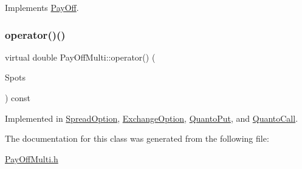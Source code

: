 Implements \hyperlink{classPayOff_a5ae17d82c233ef5568c8fb0539703000}{Pay\+Off}.

\hypertarget{classPayOffMulti_a61039e0c0ee136842b5d6f340b9f8155}{}\label{classPayOffMulti_a61039e0c0ee136842b5d6f340b9f8155} 
\subsubsection{\texorpdfstring{operator()()}{operator()()}\hspace{0.1cm}{\footnotesize\ttfamily [2/2]}}
{\footnotesize\ttfamily virtual double Pay\+Off\+Multi\+::operator() (\begin{DoxyParamCaption}\item[{const \hyperlink{classMJArray}{M\+J\+Array} \&}]{Spots }\end{DoxyParamCaption}) const\hspace{0.3cm}{\ttfamily [pure virtual]}}



Implemented in \hyperlink{classSpreadOption_ad374a8790abcf926a3a2be5fdc5676ca}{Spread\+Option}, \hyperlink{classExchangeOption_ae8d49f6d9d482c1e835e3f1c12a1a905}{Exchange\+Option}, \hyperlink{classQuantoPut_a76cf359e7b7c31dc39b8f2c20d145b92}{Quanto\+Put}, and \hyperlink{classQuantoCall_a4269b10b960c3d71cd01b4bd889534ae}{Quanto\+Call}.



The documentation for this class was generated from the following file\+:\begin{DoxyCompactItemize}
\item 
\hyperlink{PayOffMulti_8h}{Pay\+Off\+Multi.\+h}\end{DoxyCompactItemize}

